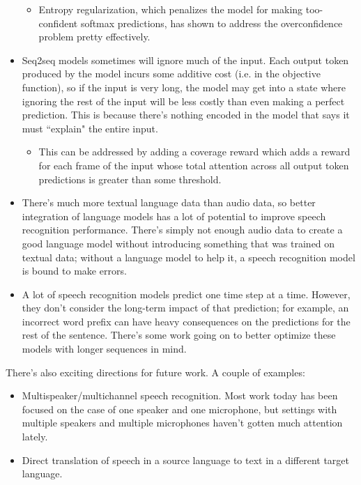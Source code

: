 \begin{itemize}
\begin{itemize}
\item Entropy regularization, which penalizes the model for making too-confident softmax predictions, has shown to address the overconfidence problem pretty effectively.
\end{itemize}
\item Seq2seq models sometimes will ignore much of the input. Each output token produced by the model incurs some additive cost (i.e. in the objective function), so if the input is very long, the model may get into a state where ignoring the rest of the input will be less costly than even making a perfect prediction. This is because there's nothing encoded in the model that says it must ``explain" the entire input.
\begin{itemize}
\item This can be addressed by adding a coverage reward which adds a reward for each frame of the input whose total attention across all output token predictions is greater than some threshold.
\end{itemize}
\item There's much more textual language data than audio data, so better integration of language models has a lot of potential to improve speech recognition performance. There's simply not enough audio data to create a good language model without introducing something that was trained on textual data; without a language model to help it, a speech recognition model is bound to make errors.
\item A lot of speech recognition models predict one time step at a time. However, they don't consider the long-term impact of that prediction; for example, an incorrect word prefix can have heavy consequences on the predictions for the rest of the sentence. There's some work going on to better optimize these models with longer sequences in mind.
\end{itemize}

There's also exciting directions for future work. A couple of examples:
\begin{itemize}
\item Multispeaker/multichannel speech recognition. Most work today has been focused on the case of one speaker and one microphone, but settings with multiple speakers and multiple microphones haven't gotten much attention lately.
\item Direct translation of speech in a source language to text in a different target language.
\end{itemize}
